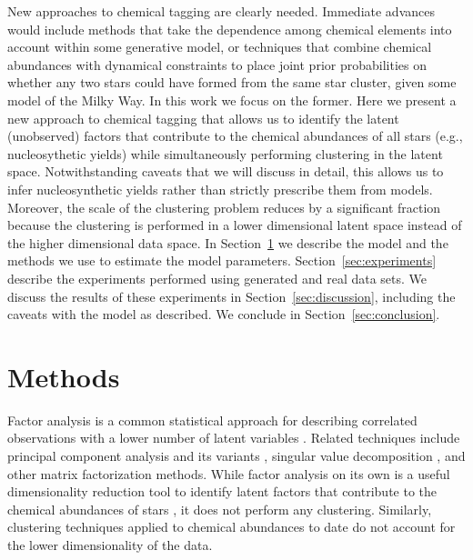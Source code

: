 \documentclass[twocolumn]{aastex61}
\begin{document}
New approaches to chemical tagging are clearly needed. Immediate advances would
include methods that take the dependence among chemical elements into account
within some generative model, or techniques that combine chemical abundances
with dynamical constraints to place joint prior probabilities on whether any
two stars could have formed from the same star cluster, given some model of the
Milky Way. In this work we focus on the former. Here we present a new approach
to chemical tagging that allows us to identify the latent (unobserved) factors
that contribute to the chemical abundances of all stars (e.g., nucleosythetic
yields) while simultaneously performing clustering in the latent space.
Notwithstanding caveats that we will
discuss in detail, this allows us to infer nucleosynthetic yields rather than
strictly prescribe them from models. Moreover, the scale of the clustering
problem reduces by a significant fraction because the clustering is performed in
a lower dimensional latent space instead of the higher dimensional data space.
In Section~\ref{sec:methods} we describe the model and the methods we use to
estimate the model parameters. Section~\ref{sec:experiments} describe the 
experiments performed using generated and real data sets. We discuss the results
of these experiments in Section~\ref{sec:discussion}, including the caveats with
the model as described. We conclude in Section~\ref{sec:conclusion}.



\section{Methods} \label{sec:methods}

Factor analysis is a common statistical approach for describing correlated 
observations with a lower number of latent variables \citep[e.g.,][]{Thompson:2004}.
Related techniques include principal component analysis \citep{Hotelling:1933} and its
variants \citep{Tipping;Bishop:1999}, singular value decomposition \citep{Golub:1970}, and other
matrix factorization methods. While factor analysis on its own is a useful
dimensionality reduction tool to identify latent factors that contribute to
the chemical abundances of stars \citep[e.g.,][]{Price-Jones:2018}, it does not perform any clustering.
Similarly, clustering techniques applied to chemical abundances to date 
\citep[e.g.,][]{Hogg:2016} do not account for the lower dimensionality of the
data. 
\end{document}
